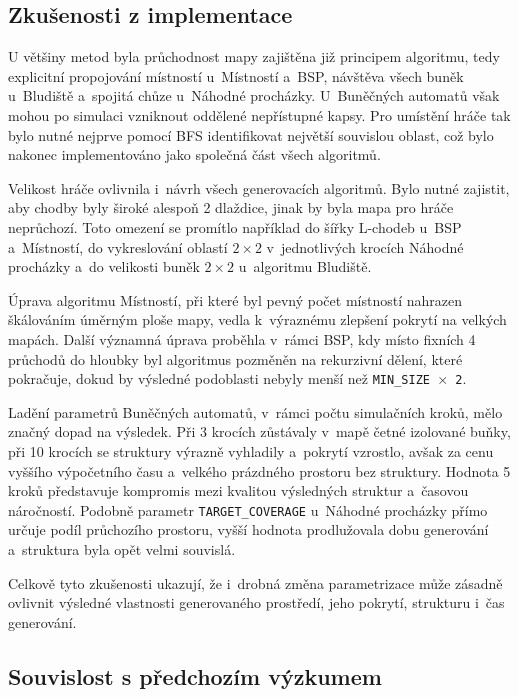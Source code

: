 \documentclass[
   program=itk,
   biblatex,
   figures=true,
   tables=true,
   glossaries,
   index
]{kidiplom}
\begin{document}
\subsection{Zkušenosti z implementace}

U většiny metod byla průchodnost mapy zajištěna již principem algoritmu, tedy explicitní propojování místností u~Místností a~BSP, návštěva všech buněk u~Bludiště a~spojitá chůze u~Náhodné procházky. U~Buněčných automatů však mohou po simulaci vzniknout oddělené nepřístupné kapsy. Pro umístění hráče tak bylo nutné nejprve pomocí BFS identifikovat největší souvislou oblast, což bylo nakonec implementováno jako společná část všech algoritmů.

Velikost hráče ovlivnila i~návrh všech generovacích algoritmů. Bylo nutné zajistit, aby chodby byly široké alespoň 2 dlaždice, jinak by byla mapa pro hráče neprůchozí. Toto omezení se promítlo například do šířky L-chodeb u~BSP a~Místností, do vykreslování oblastí $2 \times 2$ v~jednotlivých krocích Náhodné procházky a~do velikosti buněk $2 \times 2$ u~algoritmu Bludiště.

Úprava algoritmu Místností, při které byl pevný počet místností nahrazen škálováním úměrným ploše mapy, vedla k~výraznému zlepšení pokrytí na velkých mapách. Další významná úprava proběhla v~rámci BSP, kdy místo fixních 4 průchodů do hloubky byl algoritmus pozměněn na rekurzivní dělení, které pokračuje, dokud by výsledné podoblasti nebyly menší než \texttt{MIN\_SIZE~$\times$~2}.

Ladění parametrů Buněčných automatů, v~rámci počtu simulačních kroků, mělo značný dopad na výsledek. Při 3 krocích zůstávaly v~mapě četné izolované buňky, při 10 krocích se struktury výrazně vyhladily a~pokrytí vzrostlo, avšak za cenu vyššího výpočetního času a~velkého prázdného prostoru bez struktury. Hodnota 5 kroků představuje kompromis mezi kvalitou výsledných struktur a~časovou náročností. Podobně parametr \texttt{TARGET\_COVERAGE} u~Náhodné procházky přímo určuje podíl průchozího prostoru, vyšší hodnota prodlužovala dobu generování a~struktura byla opět velmi souvislá.

Celkově tyto zkušenosti ukazují, že i~drobná změna parametrizace může zásadně ovlivnit výsledné vlastnosti generovaného prostředí, jeho pokrytí, strukturu i~čas generování.

\subsection{Souvislost s předchozím výzkumem}
\end{document}
